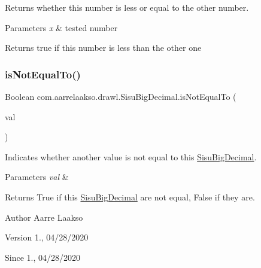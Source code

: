 Returns whether this number is less or equal to the other number. 


\begin{DoxyParams}{Parameters}
{\em x} & tested number \\
\hline
\end{DoxyParams}
\begin{DoxyReturn}{Returns}
true if this number is less than the other one 
\end{DoxyReturn}
\mbox{\label{classcom_1_1aarrelaakso_1_1drawl_1_1_sisu_big_decimal_a855e56f2f721da7239fb0f41f42dc705}} 
\subsubsection{\texorpdfstring{is\+Not\+Equal\+To()}{isNotEqualTo()}}
{\footnotesize\ttfamily Boolean com.\+aarrelaakso.\+drawl.\+Sisu\+Big\+Decimal.\+is\+Not\+Equal\+To (\begin{DoxyParamCaption}\item[{\hyperlink{classcom_1_1aarrelaakso_1_1drawl_1_1_sisu_big_decimal}{Sisu\+Big\+Decimal}}]{val }\end{DoxyParamCaption})\hspace{0.3cm}{\ttfamily [protected]}}



Indicates whether another value is not equal to this \hyperlink{classcom_1_1aarrelaakso_1_1drawl_1_1_sisu_big_decimal}{Sisu\+Big\+Decimal}. 


\begin{DoxyParams}{Parameters}
{\em val} & \\
\hline
\end{DoxyParams}
\begin{DoxyReturn}{Returns}
True if this \hyperlink{classcom_1_1aarrelaakso_1_1drawl_1_1_sisu_big_decimal}{Sisu\+Big\+Decimal} are not equal, False if they are. 
\end{DoxyReturn}
\begin{DoxyAuthor}{Author}
Aarre Laakso 
\end{DoxyAuthor}
\begin{DoxyVersion}{Version}
1., 04/28/2020 
\end{DoxyVersion}
\begin{DoxySince}{Since}
1., 04/28/2020 
\end{DoxySince}
\mbox{\label{classcom_1_1aarrelaakso_1_1drawl_1_1_sisu_big_decimal_a4ad514df6c27aa8eb865a9dead5a54fd}} 
